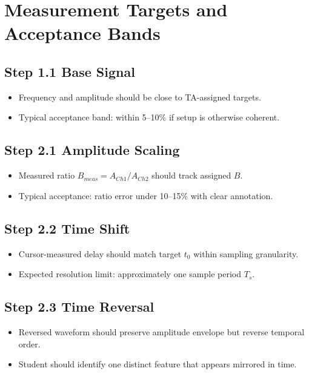 \documentclass[11pt,letterpaper]{article}
\begin{document}
\section{Measurement Targets and Acceptance Bands}

\subsection*{Step 1.1 Base Signal}
\begin{itemize}[leftmargin=1.2em]
    \item Frequency and amplitude should be close to TA-assigned targets.
    \item Typical acceptance band: within 5--10\% if setup is otherwise coherent.
\end{itemize}

\subsection*{Step 2.1 Amplitude Scaling}
\begin{itemize}[leftmargin=1.2em]
    \item Measured ratio $B_{meas}=A_{Ch1}/A_{Ch2}$ should track assigned $B$.
    \item Typical acceptance: ratio error under 10--15\% with clear annotation.
\end{itemize}

\subsection*{Step 2.2 Time Shift}
\begin{itemize}[leftmargin=1.2em]
    \item Cursor-measured delay should match target $t_0$ within sampling granularity.
    \item Expected resolution limit: approximately one sample period $T_s$.
\end{itemize}

\subsection*{Step 2.3 Time Reversal}
\begin{itemize}[leftmargin=1.2em]
    \item Reversed waveform should preserve amplitude envelope but reverse temporal order.
    \item Student should identify one distinct feature that appears mirrored in time.
\end{itemize}
\end{document}
